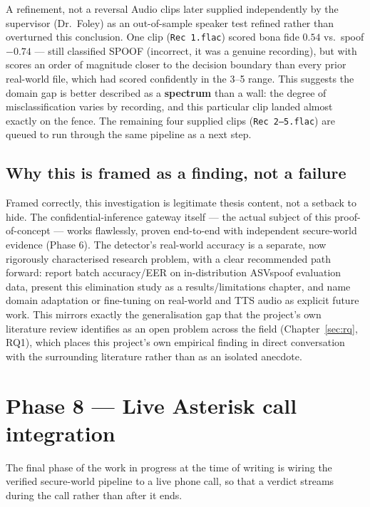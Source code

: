 \documentclass[11pt,a4paper]{report}
\newcommand{\code}[1]{\texttt{\small #1}}
\begin{document}
\begin{findingbox}{A refinement, not a reversal}
Audio clips later supplied independently by the supervisor (Dr.\ Foley) as an out-of-sample speaker
test refined rather than overturned this conclusion. One clip (\code{Rec 1.flac}) scored bona fide
$0.54$ vs.\ spoof $-0.74$ --- still classified SPOOF (incorrect, it was a genuine recording), but
with scores an order of magnitude closer to the decision boundary than every prior real-world file,
which had scored confidently in the 3--5 range. This suggests the domain gap is better described as
a \textbf{spectrum} than a wall: the degree of misclassification varies by recording, and this
particular clip landed almost exactly on the fence. The remaining four supplied clips
(\code{Rec 2--5.flac}) are queued to run through the same pipeline as a next step.
\end{findingbox}

\subsection{Why this is framed as a finding, not a failure}

Framed correctly, this investigation is legitimate thesis content, not a setback to hide. The
confidential-inference gateway itself --- the actual subject of this proof-of-concept --- works
flawlessly, proven end-to-end with independent secure-world evidence (Phase 6). The
detector's real-world accuracy is a separate, now rigorously characterised research problem, with a
clear recommended path forward: report batch accuracy/EER on in-distribution ASVspoof evaluation
data, present this elimination study as a results/limitations chapter, and name domain adaptation
or fine-tuning on real-world and TTS audio as explicit future work. This mirrors exactly the
generalisation gap that the project's own literature review identifies as an open problem across the
field (Chapter~\ref{sec:rq}, RQ1), which places this project's own empirical finding in direct
conversation with the surrounding literature rather than as an isolated anecdote.

\section{Phase 8 --- Live Asterisk call integration}
\label{sec:asterisk}

The final phase of the work in progress at the time of writing is wiring the verified secure-world
pipeline to a live phone call, so that a verdict streams during the call rather than after it ends.
\end{document}
